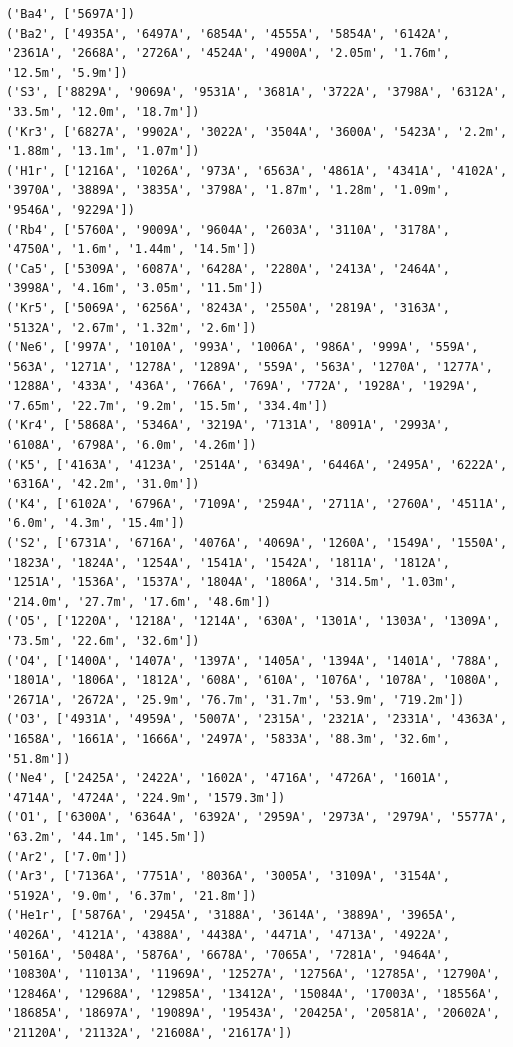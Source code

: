 \documentclass[11pt]{article}
\begin{document}
    \begin{Verbatim}[commandchars=\\\{\}]
('Ba4', ['5697A'])
('Ba2', ['4935A', '6497A', '6854A', '4555A', '5854A', '6142A', '2361A', '2668A', '2726A', '4524A', '4900A', '2.05m', '1.76m', '12.5m', '5.9m'])
('S3', ['8829A', '9069A', '9531A', '3681A', '3722A', '3798A', '6312A', '33.5m', '12.0m', '18.7m'])
('Kr3', ['6827A', '9902A', '3022A', '3504A', '3600A', '5423A', '2.2m', '1.88m', '13.1m', '1.07m'])
('H1r', ['1216A', '1026A', '973A', '6563A', '4861A', '4341A', '4102A', '3970A', '3889A', '3835A', '3798A', '1.87m', '1.28m', '1.09m', '9546A', '9229A'])
('Rb4', ['5760A', '9009A', '9604A', '2603A', '3110A', '3178A', '4750A', '1.6m', '1.44m', '14.5m'])
('Ca5', ['5309A', '6087A', '6428A', '2280A', '2413A', '2464A', '3998A', '4.16m', '3.05m', '11.5m'])
('Kr5', ['5069A', '6256A', '8243A', '2550A', '2819A', '3163A', '5132A', '2.67m', '1.32m', '2.6m'])
('Ne6', ['997A', '1010A', '993A', '1006A', '986A', '999A', '559A', '563A', '1271A', '1278A', '1289A', '559A', '563A', '1270A', '1277A', '1288A', '433A', '436A', '766A', '769A', '772A', '1928A', '1929A', '7.65m', '22.7m', '9.2m', '15.5m', '334.4m'])
('Kr4', ['5868A', '5346A', '3219A', '7131A', '8091A', '2993A', '6108A', '6798A', '6.0m', '4.26m'])
('K5', ['4163A', '4123A', '2514A', '6349A', '6446A', '2495A', '6222A', '6316A', '42.2m', '31.0m'])
('K4', ['6102A', '6796A', '7109A', '2594A', '2711A', '2760A', '4511A', '6.0m', '4.3m', '15.4m'])
('S2', ['6731A', '6716A', '4076A', '4069A', '1260A', '1549A', '1550A', '1823A', '1824A', '1254A', '1541A', '1542A', '1811A', '1812A', '1251A', '1536A', '1537A', '1804A', '1806A', '314.5m', '1.03m', '214.0m', '27.7m', '17.6m', '48.6m'])
('O5', ['1220A', '1218A', '1214A', '630A', '1301A', '1303A', '1309A', '73.5m', '22.6m', '32.6m'])
('O4', ['1400A', '1407A', '1397A', '1405A', '1394A', '1401A', '788A', '1801A', '1806A', '1812A', '608A', '610A', '1076A', '1078A', '1080A', '2671A', '2672A', '25.9m', '76.7m', '31.7m', '53.9m', '719.2m'])
('O3', ['4931A', '4959A', '5007A', '2315A', '2321A', '2331A', '4363A', '1658A', '1661A', '1666A', '2497A', '5833A', '88.3m', '32.6m', '51.8m'])
('Ne4', ['2425A', '2422A', '1602A', '4716A', '4726A', '1601A', '4714A', '4724A', '224.9m', '1579.3m'])
('O1', ['6300A', '6364A', '6392A', '2959A', '2973A', '2979A', '5577A', '63.2m', '44.1m', '145.5m'])
('Ar2', ['7.0m'])
('Ar3', ['7136A', '7751A', '8036A', '3005A', '3109A', '3154A', '5192A', '9.0m', '6.37m', '21.8m'])
('He1r', ['5876A', '2945A', '3188A', '3614A', '3889A', '3965A', '4026A', '4121A', '4388A', '4438A', '4471A', '4713A', '4922A', '5016A', '5048A', '5876A', '6678A', '7065A', '7281A', '9464A', '10830A', '11013A', '11969A', '12527A', '12756A', '12785A', '12790A', '12846A', '12968A', '12985A', '13412A', '15084A', '17003A', '18556A', '18685A', '18697A', '19089A', '19543A', '20425A', '20581A', '20602A', '21120A', '21132A', '21608A', '21617A'])

\end{Verbatim}
\end{document}
